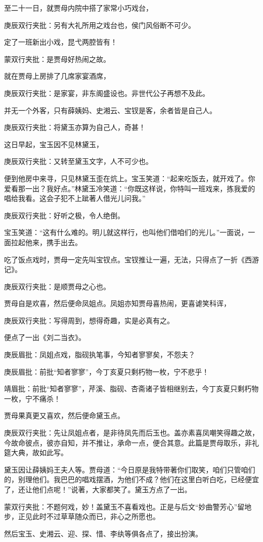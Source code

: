 \begin{parag}
    至二十一日，就贾母内院中搭了家常小巧戏台，\begin{note}庚辰双行夹批：另有大礼所用之戏台也，侯门风俗断不可少。\end{note}定了一班新出小戏，昆弋两腔皆有！\begin{note}蒙双行夹批：是贾母好热闹之故。\end{note}就在贾母上房排了几席家宴酒席，\begin{note}庚辰双行夹批：是家宴，非东阁盛设也。非世代公子再想不及此。\end{note}并无一个外客，只有薛姨妈、史湘云、宝钗是客，余者皆是自己人。\begin{note}庚辰双行夹批：将黛玉亦算为自己人，奇甚！\end{note}这日早起，宝玉因不见林黛玉，\begin{note}庚辰双行夹批：又转至黛玉文字，人不可少也。\end{note}便到他房中来寻，只见林黛玉歪在炕上。宝玉笑道：“起来吃饭去，就开戏了。你爱看那一出？我好点。”林黛玉冷笑道：“你既这样说，你特叫一班戏来，拣我爱的唱给我看。这会子犯不上跐著人借光儿问我。”\begin{note}庚辰双行夹批：好听之极，令人绝倒。\end{note}宝玉笑道：“这有什么难的。明儿就这样行，也叫他们借咱们的光儿。”一面说，一面拉起他来，携手出去。
\end{parag}


\begin{parag}
    吃了饭点戏时，贾母一定先叫宝钗点。宝钗推让一遍，无法，只得点了一折《西游记》。\begin{note}庚辰双行夹批：是顺贾母之心也。\end{note}贾母自是欢喜，然后便命凤姐点。凤姐亦知贾母喜热闹，更喜谑笑科诨，\begin{note}庚辰双行夹批：写得周到，想得奇趣，实是必真有之。\end{note}便点了一出《刘二当衣》。\begin{note}庚辰眉批：凤姐点戏，脂砚执笔事，今知者寥寥矣，不怨夫？\end{note}\begin{note}庚辰眉批：前批“知者寥寥”，今丁亥夏只剩朽物一枚，宁不悲乎！\end{note}\begin{note}靖眉批：前批“知者寥寥”，芹溪、脂砚、杏斋诸子皆相继别去，今丁亥夏只剩朽物一枚，宁不痛杀！\end{note}贾母果真更又喜欢，然后便命黛玉点。\begin{note}庚辰双行夹批：先让凤姐点者，是非待凤先而后玉也。盖亦素喜凤嘲笑得趣之故，今故命彼点，彼亦自知，并不推让，承命一点，便合其意。此篇是贾母取乐，非礼筵大典，故如此写。\end{note}黛玉因让薛姨妈王夫人等。贾母道：“今日原是我特带著你们取笑，咱们只管咱们的，别理他们。我巴巴的唱戏摆酒，为他们不成？他们在这里白听白吃，已经便宜了，还让他们点呢！”说著，大家都笑了。黛玉方点了一出。\begin{note}蒙双行夹批：不题何戏，妙！盖黛玉不喜看戏也。正是与后文“妙曲警芳心”留地步，正见此时不过草草随众而已，非心之所愿也。\end{note}然后宝玉、史湘云、迎、探、惜、李纨等俱各点了，接出扮演。
\end{parag}


